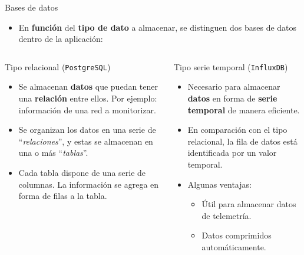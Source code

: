 \documentclass[aspectratio=169,xcolor=dvipsnames]{beamer}
\begin{document}
	
	\begin{frame}{Bases de datos}
		
		\begin{itemize}
			\item En \textbf{función} del \textbf{tipo de dato} a almacenar, se distinguen dos bases de datos dentro de la aplicación:
		\end{itemize}
		
		\begin{columns}
			\begin{column}{0.5\textwidth}
				\begin{block}{Tipo relacional (\texttt{PostgreSQL})}
					\begin{itemize}
						\item Se almacenan \textbf{datos} que puedan tener una \textbf{relación} entre ellos. Por ejemplo: información de una red a monitorizar.
						
						\item Se organizan los datos en una serie de ``\textit{relaciones}'', y estas se almacenan en una o más ``\textit{tablas}''.
						
						\item Cada tabla dispone de una serie de columnas. La información se agrega en forma de filas a la tabla.
					\end{itemize}
				\end{block}
			\end{column}
			
			
			\begin{column}{0.5\textwidth}
				\begin{block}{Tipo serie temporal (\texttt{InfluxDB})}
					\begin{itemize}
						\item Necesario para almacenar \textbf{datos} en forma de \textbf{serie temporal} de manera eficiente.
						
						\item En comparación con el tipo relacional, la fila de datos está identificada por un valor temporal.
						
						\item Algunas ventajas:
						\begin{itemize}
							\item Útil para almacenar datos de telemetría.
							\item Datos comprimidos automáticamente.
						\end{itemize}
					\end{itemize}
				\end{block}
			\end{column}
		\end{columns}
	\end{frame}
	
\end{document}
